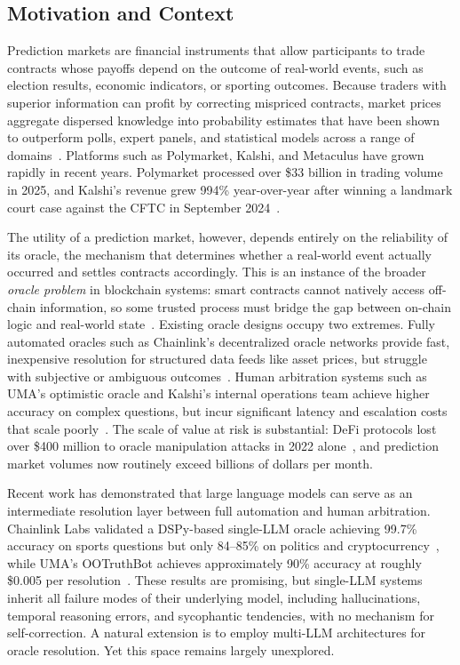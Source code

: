 \subsection{Motivation and Context}

Prediction markets are financial instruments that allow participants to trade contracts whose payoffs depend on the outcome of real-world events, such as election results, economic indicators, or sporting outcomes. Because traders with superior information can profit by correcting mispriced contracts, market prices aggregate dispersed knowledge into probability estimates that have been shown to outperform polls, expert panels, and statistical models across a range of domains~\cite{arrow2008promise, berg2008prediction}. Platforms such as Polymarket, Kalshi, and Metaculus have grown rapidly in recent years. Polymarket processed over \$33 billion in trading volume in 2025, and Kalshi's revenue grew 994\% year-over-year after winning a landmark court case against the CFTC in September 2024~\cite{kalshi2024cftc}.

The utility of a prediction market, however, depends entirely on the reliability of its oracle, the mechanism that determines whether a real-world event actually occurred and settles contracts accordingly. This is an instance of the broader \emph{oracle problem} in blockchain systems: smart contracts cannot natively access off-chain information, so some trusted process must bridge the gap between on-chain logic and real-world state~\cite{caldarelli2020oracle, ellis2017chainlink}. Existing oracle designs occupy two extremes. Fully automated oracles such as Chainlink's decentralized oracle networks provide fast, inexpensive resolution for structured data feeds like asset prices, but struggle with subjective or ambiguous outcomes~\cite{chainlink2021v2}. Human arbitration systems such as UMA's optimistic oracle and Kalshi's internal operations team achieve higher accuracy on complex questions, but incur significant latency and escalation costs that scale poorly~\cite{uma2024oracle, kalshi_outcomes}. The scale of value at risk is substantial: DeFi protocols lost over \$400 million to oracle manipulation attacks in 2022 alone~\cite{caldarelli2020oracle}, and prediction market volumes now routinely exceed billions of dollars per month.

Recent work has demonstrated that large language models can serve as an intermediate resolution layer between full automation and human arbitration. Chainlink Labs validated a DSPy-based single-LLM oracle achieving 99.7\% accuracy on sports questions but only 84--85\% on politics and cryptocurrency~\cite{chainlink2025aioracles}, while UMA's OOTruthBot achieves approximately 90\% accuracy at roughly \$0.005 per resolution~\cite{uma2025truthbot}. These results are promising, but single-LLM systems inherit all failure modes of their underlying model, including hallucinations, temporal reasoning errors, and sycophantic tendencies, with no mechanism for self-correction. A natural extension is to employ multi-LLM architectures for oracle resolution. Yet this space remains largely unexplored.

